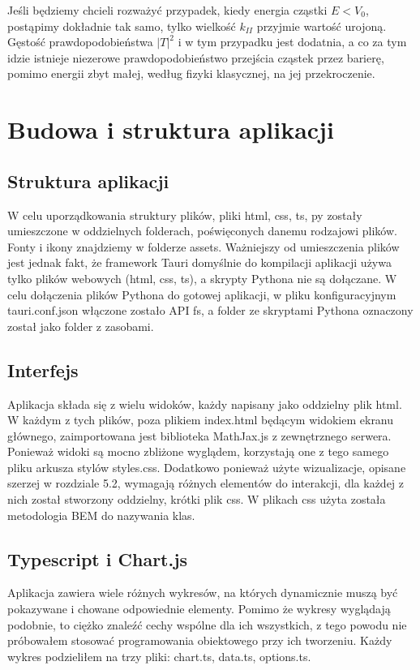 \documentclass{SGGW-thesis}
\begin{document}
	Jeśli będziemy chcieli rozważyć przypadek, kiedy energia cząstki $E < V_0$, postąpimy dokładnie tak samo, tylko wielkość $k_{II}$ przyjmie wartość urojoną. Gęstość prawdopodobieństwa $|T|^2$ i w tym przypadku jest dodatnia, a co za tym idzie istnieje niezerowe prawdopodobieństwo przejścia cząstek przez barierę, pomimo energii zbyt małej, według fizyki klasycznej, na jej przekroczenie.
	
	
\chapter{Budowa i struktura aplikacji}
	\section{Struktura aplikacji}
	W celu uporządkowania struktury plików, pliki html, css, ts, py zostały umieszczone w oddzielnych folderach, poświęconych danemu rodzajowi plików. Fonty i ikony znajdziemy w folderze assets. Ważniejszy od umieszczenia plików jest jednak fakt, że framework Tauri domyślnie do kompilacji aplikacji używa tylko plików webowych (html, css, ts), a skrypty Pythona nie są dołączane. W celu dołączenia plików Pythona do gotowej aplikacji, w pliku konfiguracyjnym tauri.conf.json włączone zostało API fs, a folder ze skryptami Pythona oznaczony został jako folder z zasobami.
	\section{Interfejs}
	Aplikacja składa się z wielu widoków, każdy napisany jako oddzielny plik html. W każdym z tych plików, poza plikiem index.html będącym widokiem ekranu głównego, zaimportowana jest biblioteka MathJax.js z zewnętrznego serwera. Ponieważ widoki są mocno zbliżone wyglądem, korzystają one z tego samego pliku arkusza stylów styles.css. Dodatkowo ponieważ użyte wizualizacje, opisane szerzej w rozdziale 5.2, wymagają różnych elementów do interakcji, dla każdej z nich został stworzony oddzielny, krótki plik css. W plikach css użyta została metodologia BEM \cite{bem} do nazywania klas.
	
	\section{Typescript i Chart.js}
	Aplikacja zawiera wiele różnych wykresów, na których dynamicznie muszą być pokazywane i chowane odpowiednie elementy. Pomimo że wykresy wyglądają podobnie, to ciężko znaleźć cechy wspólne dla ich wszystkich, z tego powodu nie próbowałem stosować programowania obiektowego przy ich tworzeniu. Każdy wykres podzieliłem na trzy pliki: chart.ts, data.ts, options.ts. 
	
\end{document}
